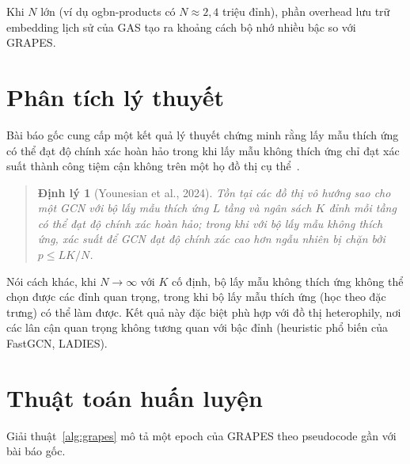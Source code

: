 Khi $N$ lớn (ví dụ ogbn-products có $N \approx 2{,}4$ triệu đỉnh), phần overhead lưu trữ embedding lịch sử của GAS tạo ra khoảng cách bộ nhớ nhiều bậc so với GRAPES.

\section{Phân tích lý thuyết}

Bài báo gốc cung cấp một kết quả lý thuyết chứng minh rằng lấy mẫu thích ứng có thể đạt độ chính xác hoàn hảo trong khi lấy mẫu không thích ứng chỉ đạt xác suất thành công tiệm cận không trên một họ đồ thị cụ thể~\cite{Younesian2023GRAPES}.

\begin{quote}
\textbf{Định lý 1} (Younesian et al., 2024).
\textit{Tồn tại các đồ thị vô hướng sao cho một GCN với bộ lấy mẫu thích ứng $L$ tầng và ngân sách $K$ đỉnh mỗi tầng có thể đạt độ chính xác hoàn hảo; trong khi với bộ lấy mẫu không thích ứng, xác suất để GCN đạt độ chính xác cao hơn ngẫu nhiên bị chặn bởi $p \leq LK/N$.}
\end{quote}

Nói cách khác, khi $N \to \infty$ với $K$ cố định, bộ lấy mẫu không thích ứng không thể chọn được các đỉnh quan trọng, trong khi bộ lấy mẫu thích ứng (học theo đặc trưng) có thể làm được. Kết quả này đặc biệt phù hợp với đồ thị heterophily, nơi các lân cận quan trọng không tương quan với bậc đỉnh (heuristic phổ biến của FastGCN, LADIES).

\section{Thuật toán huấn luyện}

Giải thuật~\ref{alg:grapes} mô tả một epoch của GRAPES theo pseudocode gần với bài báo gốc.

\begin{algorithm}[H]
\caption{Một epoch huấn luyện GRAPES~\cite{Younesian2023GRAPES}}
\label{alg:grapes}
\end{algorithm}
